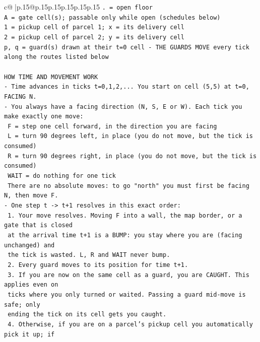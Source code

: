\documentclass{article}
\begin{document}
{\begin{supertabular}{c@{$\;$}|p{.15\linewidth}@{}p{.15\linewidth}p{.15\linewidth}p{.15\linewidth}p{.15\linewidth}p{.15\linewidth}}
{{{\texttt{. = open floor} \\
\texttt{A = gate cell(s); passable only while open (schedules below)} \\
\texttt{1 = pickup cell of parcel 1; x = its delivery cell} \\
\texttt{2 = pickup cell of parcel 2; y = its delivery cell} \\
\texttt{p, q = guard(s) drawn at their t=0 cell {-} THE GUARDS MOVE every tick along the routes listed below} \\
\\ 
\texttt{HOW TIME AND MOVEMENT WORK} \\
\texttt{{-} Time advances in ticks t=0,1,2,... You start on cell (5,5) at t=0, FACING N.} \\
\texttt{{-} You always have a facing direction (N, S, E or W). Each tick you make exactly one move:} \\
\texttt{  F    = step one cell forward, in the direction you are facing} \\
\texttt{  L    = turn 90 degrees left, in place (you do not move, but the tick is consumed)} \\
\texttt{  R    = turn 90 degrees right, in place (you do not move, but the tick is consumed)} \\
\texttt{  WAIT = do nothing for one tick} \\
\texttt{  There are no absolute moves: to go "north" you must first be facing N, then move F.} \\
\texttt{{-} One step t {-}> t+1 resolves in this exact order:} \\
\texttt{  1. Your move resolves. Moving F into a wall, the map border, or a gate that is closed} \\
\texttt{     at the arrival time t+1 is a BUMP: you stay where you are (facing unchanged) and} \\
\texttt{     the tick is wasted. L, R and WAIT never bump.} \\
\texttt{  2. Every guard moves to its position for time t+1.} \\
\texttt{  3. If you are now on the same cell as a guard, you are CAUGHT. This applies even on} \\
\texttt{     ticks where you only turned or waited. Passing a guard mid{-}move is safe; only} \\
\texttt{     ending the tick on its cell gets you caught.} \\
\texttt{  4. Otherwise, if you are on a parcel's pickup cell you automatically pick it up; if} \\
}}}
\end{supertabular}}
\end{document}
